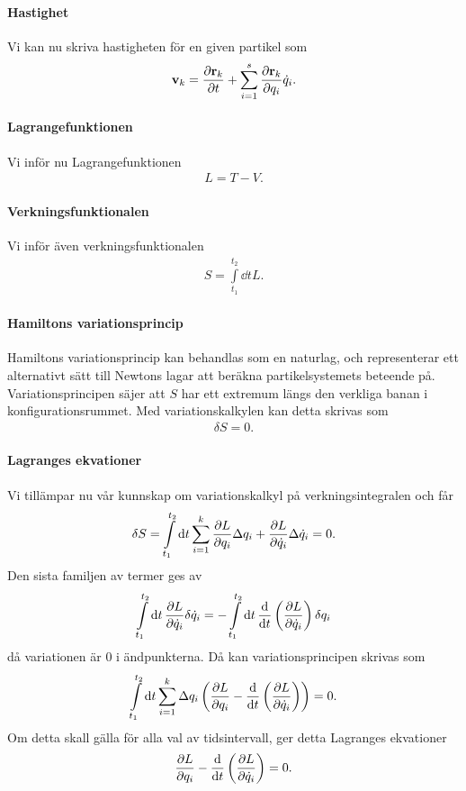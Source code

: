 \paragraph{Hastighet}
Vi kan nu skriva hastigheten för en given partikel som
\begin{align*}
	\vb{v}_{k} = \pdv{\vb{r}_{k}}{t} + \sum\limits_{i = 1}^{s}\pdv{\vb{r}_{k}}{q_{i}}\dot{q}_{i}.
\end{align*}

\paragraph{Lagrangefunktionen}
Vi inför nu Lagrangefunktionen
\begin{align*}
	L = T - V.
\end{align*}

\paragraph{Verkningsfunktionalen}
Vi inför även verkningsfunktionalen
\begin{align*}
	S = \int\limits_{t_{1}}^{t_{2}}\dd{t}L.
\end{align*}

\paragraph{Hamiltons variationsprincip}
Hamiltons variationsprincip kan behandlas som en naturlag, och representerar ett alternativt sätt till Newtons lagar att beräkna partikelsystemets beteende på. Variationsprincipen säjer att $S$ har ett extremum längs den verkliga banan i konfigurationsrummet. Med variationskalkylen kan detta skrivas som
\begin{align*}
	\delta S = 0.
\end{align*}

\paragraph{Lagranges ekvationer}
Vi tillämpar nu vår kunnskap om variationskalkyl på verkningsintegralen och får
\begin{align*}
	\delta S = \int\limits_{t_{1}}^{t_{2}}\dd{t}\sum\limits_{i = 1}^{k}\pdv{L}{q_{i}}\Delta q_{i} + \pdv{L}{\dot{q}_{i}}\Delta \dot{q}_{i} = 0.
\end{align*}
Den sista familjen av termer ges av
\begin{align*}
	\int\limits_{t_{1}}^{t_{2}}\dd{t}\pdv{L}{\dot{q}_{i}}\delta \dot{q}_{i} = -\int\limits_{t_{1}}^{t_{2}}\dd{t}\dv{t}\left(\pdv{L}{\dot{q}_{i}}\right)\delta q_{i}
\end{align*}
då variationen är $0$ i ändpunkterna. Då kan variationsprincipen skrivas som
\begin{align*}
	\int\limits_{t_{1}}^{t_{2}}\dd{t}\sum\limits_{i = 1}^{k}\Delta q_{i}\left(\pdv{L}{q_{i}} - \dv{t}\left(\pdv{L}{\dot{q}_{i}}\right)\right) = 0.
\end{align*}
Om detta skall gälla för alla val av tidsintervall, ger detta Lagranges ekvationer
\begin{align*}
	\pdv{L}{q_{i}} - \dv{t}\left(\pdv{L}{\dot{q}_{i}}\right) = 0.
\end{align*}